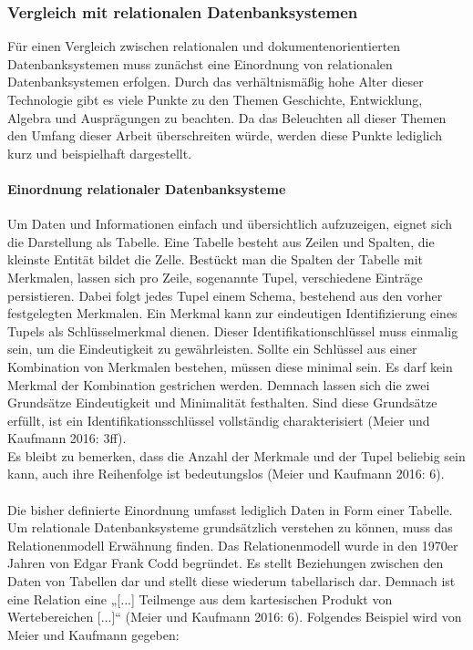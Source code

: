 \documentclass[a4paper]{scrartcl}
\begin{document}
    
\subsubsection{Vergleich mit relationalen Datenbanksystemen}
Für einen Vergleich zwischen relationalen und dokumentenorientierten Datenbanksystemen muss zunächst eine Einordnung von relationalen Datenbanksystemen erfolgen. Durch das verhältnismäßig hohe Alter dieser Technologie gibt es viele Punkte zu den Themen Geschichte, Entwicklung, Algebra und Ausprägungen zu beachten. Da das Beleuchten all dieser Themen den Umfang dieser Arbeit überschreiten würde, werden diese Punkte lediglich kurz und beispielhaft dargestellt.

\paragraph{Einordnung relationaler Datenbanksysteme}
Um Daten und Informationen einfach und übersichtlich aufzuzeigen, eignet sich die Darstellung als Tabelle. Eine Tabelle besteht aus Zeilen und Spalten, die kleinste Entität bildet die Zelle. Bestückt man die Spalten der Tabelle mit Merkmalen, lassen sich pro Zeile, sogenannte Tupel, verschiedene Einträge persistieren. Dabei folgt jedes Tupel einem Schema, bestehend aus den vorher festgelegten Merkmalen. Ein Merkmal kann zur eindeutigen Identifizierung eines Tupels als Schlüsselmerkmal dienen. Dieser Identifikationschlüssel muss einmalig sein, um die Eindeutigkeit zu gewährleisten. Sollte ein Schlüssel aus einer Kombination von Merkmalen bestehen, müssen diese minimal sein. Es darf kein Merkmal der Kombination gestrichen werden. Demnach lassen sich die zwei Grundsätze Eindeutigkeit und Minimalität festhalten. Sind diese Grundsätze erfüllt, ist ein Identifikationsschlüssel vollständig charakterisiert (Meier und Kaufmann 2016: 3ff). \\
Es bleibt zu bemerken, dass die Anzahl der Merkmale und der Tupel beliebig sein kann, auch ihre Reihenfolge ist bedeutungslos (Meier und Kaufmann 2016: 6). \\ \\
Die bisher definierte Einordnung umfasst lediglich Daten in Form einer Tabelle. Um relationale Datenbanksysteme grundsätzlich verstehen zu können, muss das Relationenmodell Erwähnung finden. Das Relationenmodell wurde in den 1970er Jahren von Edgar Frank Codd begründet. Es stellt Beziehungen zwischen den Daten von Tabellen dar und stellt diese wiederum tabellarisch dar. Demnach ist eine Relation eine „[...] Teilmenge aus dem kartesischen Produkt von Wertebereichen [...]“ (Meier und Kaufmann 2016: 6). Folgendes Beispiel wird von Meier und Kaufmann gegeben:
\end{document}
